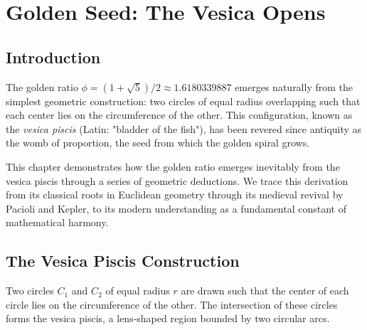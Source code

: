 
\chapter{Golden Seed: The Vesica Opens}

\section{Introduction}

The golden ratio $\phi = (1+\sqrt{5})/2 \approx 1.6180339887$ emerges naturally from the simplest geometric construction: two circles of equal radius overlapping such that each center lies on the circumference of the other. This configuration, known as the \emph{vesica piscis} (Latin: "bladder of the fish"), has been revered since antiquity as the womb of proportion, the seed from which the golden spiral grows.

This chapter demonstrates how the golden ratio emerges inevitably from the vesica piscis through a series of geometric deductions. We trace this derivation from its classical roots in Euclidean geometry through its medieval revival by Pacioli and Kepler, to its modern understanding as a fundamental constant of mathematical harmony.

\section{The Vesica Piscis Construction}

\begin{definition}
Two circles $C_1$ and $C_2$ of equal radius $r$ are drawn such that the center of each circle lies on the circumference of the other. The intersection of these circles forms the vesica piscis, a lens-shaped region bounded by two circular arcs.
\end{definition}


